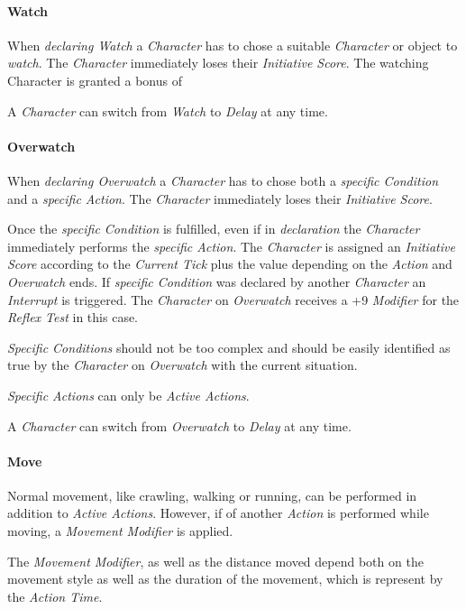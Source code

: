 \paragraph{Watch}
When \emph{declaring Watch} a \emph{Character} has to chose a suitable
\emph{Character} or object to \emph{watch}. The \emph{Character} immediately loses
their \emph{Initiative Score}. The watching Character is granted a bonus of

A \emph{Character} can switch from \emph{Watch} to \emph{Delay} at any time.

\paragraph{Overwatch}
When \emph{declaring Overwatch} a \emph{Character} has to chose both a
\emph{specific Condition} and a \emph{specific Action}. The \emph{Character}
immediately loses their \emph{Initiative Score}.

Once the \emph{specific Condition} is fulfilled, even if in \emph{declaration} the
\emph{Character} immediately performs the \emph{specific Action}. The \emph{Character}
is assigned an \emph{Initiative Score} according to the \emph{Current Tick}
plus the value depending on the \emph{Action} and \emph{Overwatch} ends.
If \emph{specific Condition} was declared by another \emph{Character} an
\emph{Interrupt} is triggered. The \emph{Character} on \emph{Overwatch} receives
a +9 \emph{Modifier} for the \emph{Reflex Test} in this case.

\emph{Specific Conditions} should not be too complex and should be easily
identified as true by the \emph{Character} on \emph{Overwatch} with the current
situation.

\emph{Specific Actions} can only be \emph{Active Actions}.

A \emph{Character} can switch from \emph{Overwatch} to \emph{Delay} at any time.

\paragraph{Move}
Normal movement, like crawling, walking or running, can be performed in addition
to \emph{Active Actions}. However, if of another \emph{Action} is performed while
moving, a \emph{Movement Modifier} is applied.

The \emph{Movement Modifier}, as well as the distance moved depend both on the
movement style as well as the duration of the movement, which is represent by the
\emph{Action Time}.

